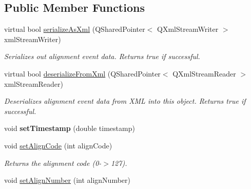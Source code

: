 \subsection*{Public Member Functions}
\begin{DoxyCompactItemize}
\item 
\hypertarget{class_picto_1_1_alignment_data_unit_ab7a0a812d227c34094d05772a97d56d8}{virtual bool \hyperlink{class_picto_1_1_alignment_data_unit_ab7a0a812d227c34094d05772a97d56d8}{serialize\-As\-Xml} (Q\-Shared\-Pointer$<$ Q\-Xml\-Stream\-Writer $>$ xml\-Stream\-Writer)}\label{class_picto_1_1_alignment_data_unit_ab7a0a812d227c34094d05772a97d56d8}

\begin{DoxyCompactList}\small\item\em Serializes out alignment event data. Returns true if successful. \end{DoxyCompactList}\item 
\hypertarget{class_picto_1_1_alignment_data_unit_a2607f81109d13dbc3706a0845f6449b4}{virtual bool \hyperlink{class_picto_1_1_alignment_data_unit_a2607f81109d13dbc3706a0845f6449b4}{deserialize\-From\-Xml} (Q\-Shared\-Pointer$<$ Q\-Xml\-Stream\-Reader $>$ xml\-Stream\-Reader)}\label{class_picto_1_1_alignment_data_unit_a2607f81109d13dbc3706a0845f6449b4}

\begin{DoxyCompactList}\small\item\em Deserializes alignment event data from X\-M\-L into this object. Returns true if successful. \end{DoxyCompactList}\item 
\hypertarget{class_picto_1_1_alignment_data_unit_a273cb3e80505c2135dc8a64ef151f82a}{void {\bfseries set\-Timestamp} (double timestamp)}\label{class_picto_1_1_alignment_data_unit_a273cb3e80505c2135dc8a64ef151f82a}

\item 
\hypertarget{class_picto_1_1_alignment_data_unit_a420935dd0742ef50720e8c912ffea7d8}{void \hyperlink{class_picto_1_1_alignment_data_unit_a420935dd0742ef50720e8c912ffea7d8}{set\-Align\-Code} (int align\-Code)}\label{class_picto_1_1_alignment_data_unit_a420935dd0742ef50720e8c912ffea7d8}

\begin{DoxyCompactList}\small\item\em Returns the alignment code (0-\/$>$127). \end{DoxyCompactList}\item 
\hypertarget{class_picto_1_1_alignment_data_unit_a7df4a1bca644cb3f8544c890bf397156}{void \hyperlink{class_picto_1_1_alignment_data_unit_a7df4a1bca644cb3f8544c890bf397156}{set\-Align\-Number} (int align\-Number)}\label{class_picto_1_1_alignment_data_unit_a7df4a1bca644cb3f8544c890bf397156}


\end{DoxyCompactItemize}
